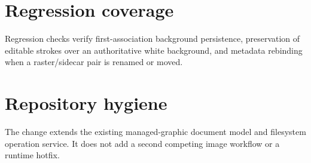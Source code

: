 \documentclass[a4paper]{article}
\begin{document}
\section{Regression coverage}
Regression checks verify first-association background persistence, preservation of
editable strokes over an authoritative white background, and metadata rebinding
when a raster/sidecar pair is renamed or moved.

\section{Repository hygiene}
The change extends the existing managed-graphic document model and filesystem
operation service. It does not add a second competing image workflow or a
runtime hotfix.
\end{document}
